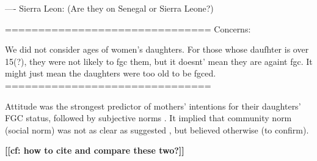 \documentclass[12pt,]{article}
\newcommand{\comment}[1]{\textbf{[[#1]]}}
\begin{document}
---- Sierra Leon: 
\cite{ShelHern06, ShelHern13}  (Are they on Senegal or Sierra Leone?)

===============================
Concerns:

We did not consider ages of women's daughters.  For those whose daufhter is over 15(?), they were not likely to fgc them, but it doesnt' mean they are againt fgc.  It might just mean the daughters were too old to be fgced. 
===============================


Attitude was the strongest predictor of mothers' intentions for their daughters' FGC status, followed by subjective norms \cite{PashPonn16}. It implied that community norm (social norm) was not as clear as suggested \cite{EffeVogt15}, but believed otherwise \cite{DuncWand11, Hayf06, Mack96, Mack00, Mack06, Youn02} (to confirm).


\comment{cf: how to cite \cite{AkhmWord13,EffeVogt15} and compare these two?}




\end{document}
